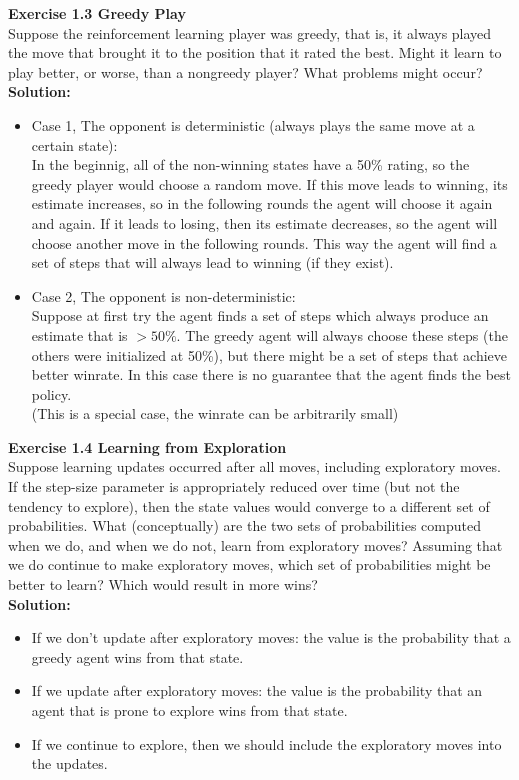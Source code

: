 \textbf{Exercise 1.3 Greedy Play} \\
Suppose the reinforcement learning player was greedy, that is,
it always played the move that brought it to the position that it rated the best. Might it learn to play better, or worse, than a nongreedy player? What problems might occur? \\

\textbf{Solution:}
\begin{itemize}
    \item Case 1, The opponent is deterministic (always plays the same move at a certain state):\\
    In the beginnig, all of the non-winning states have a 50\% rating, so the greedy player would choose a random move. If this move leads to winning, its estimate increases, so in the following rounds the agent will choose it again and again. If it leads to losing, then its estimate decreases, so the agent will choose another move in the following rounds. This way the agent will find a set of steps that will always lead to winning (if they exist).
    \item Case 2, The opponent is non-deterministic:\\
    Suppose at first try the agent finds a set of steps which always produce an estimate that is $>50\%$. The greedy agent will always choose these steps (the others were initialized at 50\%), but there might be a set of steps that achieve better winrate. In this case there is no guarantee that the agent finds the best policy.\\
    (This is a special case, the winrate can be arbitrarily small)  
  \end{itemize}

\textbf{Exercise 1.4 Learning from Exploration} \\
Suppose learning updates occurred after all
moves, including exploratory moves. If the step-size parameter is appropriately reduced
over time (but not the tendency to explore), then the state values would converge to
a different set of probabilities. What (conceptually) are the two sets of probabilities
computed when we do, and when we do not, learn from exploratory moves? Assuming
that we do continue to make exploratory moves, which set of probabilities might be better
to learn? Which would result in more wins?\\

\textbf{Solution:}
\begin{itemize}
    \item If we don't update after exploratory moves: the value is the probability that a greedy agent wins from that state.
    \item If we update after exploratory moves: the value is the probability that an agent that is prone to explore wins from that state.
    \item If we continue to explore, then we should include the exploratory moves into the updates.
\end{itemize}

